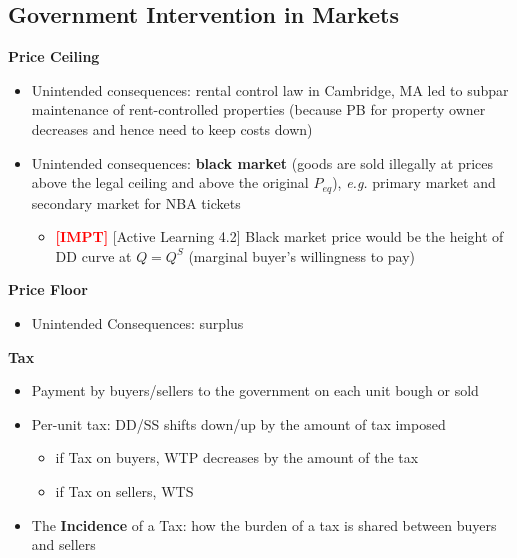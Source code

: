 \documentclass{article}
\newcommand{\eg}[0]{\textit{e.g. }}
\newcommand{\impt}[0]{\textcolor{red}{\textbf{[IMPT] }}}
\begin{document}
\begin{multicols}{2}
\subsection{Government Intervention in Markets}
\textbf{Price Ceiling}
\begin{itemize}
	\item Unintended consequences: rental control law in Cambridge, MA led to subpar maintenance of rent-controlled properties (because PB for property owner decreases and hence need to keep costs down)
	\item Unintended consequences: \textbf{black market} (goods are sold illegally at prices above the legal ceiling and above the original $P_{eq}$), \eg primary market and secondary market for NBA tickets
	\begin{itemize}
		\item \impt [Active Learning 4.2] Black market price would be the height of DD curve at $Q=Q^S$ (marginal buyer's willingness to pay)
	\end{itemize}
\end{itemize}
\textbf{Price Floor}
\begin{itemize}
	\item Unintended Consequences: surplus
\end{itemize}
\textbf{Tax}
\begin{itemize}
	\item Payment by buyers/sellers to the government on each unit bough or sold
	\item Per-unit tax: DD/SS shifts down/up by the amount of tax imposed
	\begin{itemize}
		\item if Tax on buyers, WTP decreases by the amount of the tax
		\item if Tax on sellers, WTS
	\end{itemize}
\item The \textbf{Incidence} of a Tax: how the burden of a tax is shared  between buyers and sellers

\end{itemize}
\end{multicols}
\end{document}
